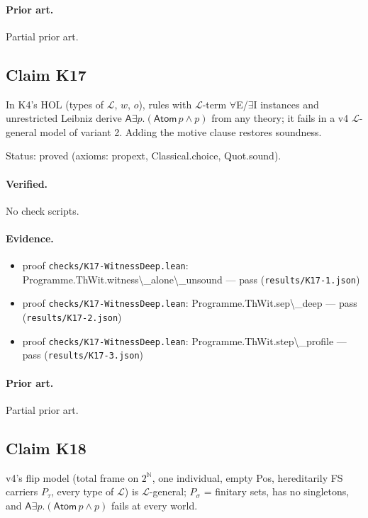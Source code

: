 \documentclass{article}
\begin{document}
\paragraph{Prior art.} Partial prior art.

\subsection*{Claim K17}

In K4's HOL (types of $\mathcal L$, $w$, $o$), rules with $\mathcal L$-term $\forall$E/$\exists$I instances and unrestricted Leibniz derive $\mathsf A\exists p.(\mathsf{Atom}\,p\wedge p)$ from any theory; it fails in a v4 $\mathcal L$-general model of variant 2. Adding the motive clause restores soundness.

Status: proved (axioms: propext, Classical.choice, Quot.sound).

\paragraph{Verified.}
No check scripts.

\paragraph{Evidence.}
\begin{itemize}
\item proof \texttt{checks/K17-WitnessDeep.lean}: Programme.ThWit.witness\textbackslash{}\_alone\textbackslash{}\_unsound --- pass (\texttt{results/K17-1.json})
\item proof \texttt{checks/K17-WitnessDeep.lean}: Programme.ThWit.sep\textbackslash{}\_deep --- pass (\texttt{results/K17-2.json})
\item proof \texttt{checks/K17-WitnessDeep.lean}: Programme.ThWit.step\textbackslash{}\_profile --- pass (\texttt{results/K17-3.json})
\end{itemize}

\paragraph{Prior art.} Partial prior art.

\subsection*{Claim K18}

v4's flip model (total frame on $2^{\mathbb N}$, one individual, empty Pos, hereditarily FS carriers $P_\tau$, every type of $\mathcal L$) is $\mathcal L$-general; $P_\sigma$ = finitary sets, has no singletons, and $\mathsf A\exists p.(\mathsf{Atom}\,p\wedge p)$ fails at every world.
\end{document}
